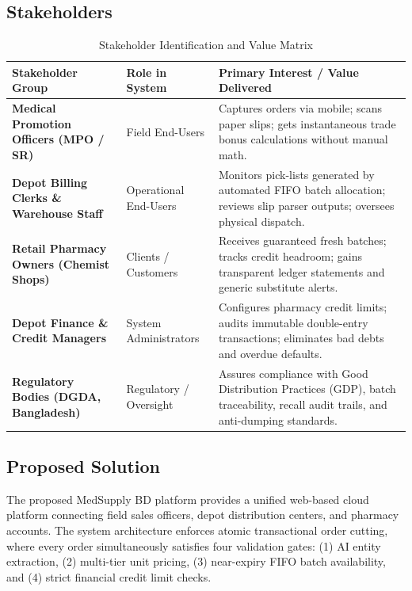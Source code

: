 \documentclass[12pt,a4paper]{article}
\begin{document}
\subsection{Stakeholders}
\begin{table}[h!]
\centering
\small
\begin{tabularx}{\textwidth}{p{3.2cm}p{3.5cm}X}
\toprule
\textbf{Stakeholder Group} & \textbf{Role in System} & \textbf{Primary Interest / Value Delivered} \\
\midrule
\textbf{Medical Promotion Officers (MPO / SR)} & Field End-Users & Captures orders via mobile; scans paper slips; gets instantaneous trade bonus calculations without manual math. \\
\addlinespace
\textbf{Depot Billing Clerks \& Warehouse Staff} & Operational End-Users & Monitors pick-lists generated by automated FIFO batch allocation; reviews slip parser outputs; oversees physical dispatch. \\
\addlinespace
\textbf{Retail Pharmacy Owners (Chemist Shops)} & Clients / Customers & Receives guaranteed fresh batches; tracks credit headroom; gains transparent ledger statements and generic substitute alerts. \\
\addlinespace
\textbf{Depot Finance \& Credit Managers} & System Administrators & Configures pharmacy credit limits; audits immutable double-entry transactions; eliminates bad debts and overdue defaults. \\
\addlinespace
\textbf{Regulatory Bodies (DGDA, Bangladesh)} & Regulatory / Oversight & Assures compliance with Good Distribution Practices (GDP), batch traceability, recall audit trails, and anti-dumping standards. \\
\bottomrule
\end{tabularx}
\caption{Stakeholder Identification and Value Matrix}
\end{table}

\subsection{Proposed Solution}
The proposed MedSupply BD platform provides a unified web-based cloud platform connecting field sales officers, depot distribution centers, and pharmacy accounts. The system architecture enforces atomic transactional order cutting, where every order simultaneously satisfies four validation gates: (1) AI entity extraction, (2) multi-tier unit pricing, (3) near-expiry FIFO batch availability, and (4) strict financial credit limit checks.
\end{document}

